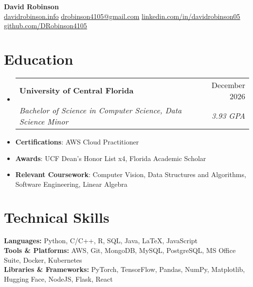 \documentclass[letterpaper,11pt]{article}
\makeatletter
\newcommand{\educationItem}[1]{
  \item\small{
    {#1 \vspace{-5pt}}
  }
}
\newcommand{\resumeSubheading}[4]{
  \vspace{-2pt}\item
    \begin{tabular*}{0.97\textwidth}[t]{l@{\extracolsep{\fill}}r}
      \textbf{#1} & #2 \\
      \textit{\small#3} & \textit{\small #4} \\
    \end{tabular*}\vspace{-7pt}
}
\newcommand{\resumeSubHeadingListStart}{\begin{itemize}[leftmargin=0.15in, label={}]}
\newcommand{\resumeSubHeadingListEnd}{\end{itemize}}
\makeatother
\begin{document}
\begin{center}
  \textbf{\Huge David Robinson} \\ \vspace{2pt} \small
  \faCode\hspace{0.25pt} \href{https://www.davidrobinson.info/}{\uline{davidrobinson.info}}
  \faEnvelope\hspace{0.25pt} \href{mailto:drobinson4105@gmail.com}{\uline{drobinson4105@gmail.com}}
  \faLinkedin\hspace{0.25pt} \href{https://linkedin.com/in/davidrobinson05}{\uline{linkedin.com/in/davidrobinson05}}
  \faGithub\hspace{0.25pt} \href{https://github.com/DRobinson4105}{\uline{github.com/DRobinson4105}}
\end{center}

\section{Education}
  \resumeSubHeadingListStart
    \resumeSubheading
      {University of Central Florida}{December 2026}
      {Bachelor of Science in Computer Science, Data Science Minor}{3.93 GPA}
    \educationItem{\textbf{Certifications}: AWS Cloud Practitioner}
    \educationItem{\textbf{Awards}: UCF Dean's Honor List x4, Florida Academic Scholar}
    \educationItem{\textbf{Relevant Coursework}: Computer Vision, Data Structures and Algorithms, Software Engineering, Linear Algebra}
  \resumeSubHeadingListEnd

\section{Technical Skills}
  \begin{itemize}[leftmargin=0.15in, label={}]
    \small{\item{
      \textbf{Languages:}{ Python, C/C++, R, SQL, Java, LaTeX, JavaScript} \\
      \textbf{Tools \& Platforms:}{ AWS, Git, MongoDB, MySQL, PostgreSQL, MS Office Suite, Docker, Kubernetes} \\
      \textbf{Libraries \& Frameworks:}{ PyTorch, TensorFlow, Pandas, NumPy, Matplotlib, Hugging Face, NodeJS, Flask, React}
    }}
  \end{itemize}
\end{document}
